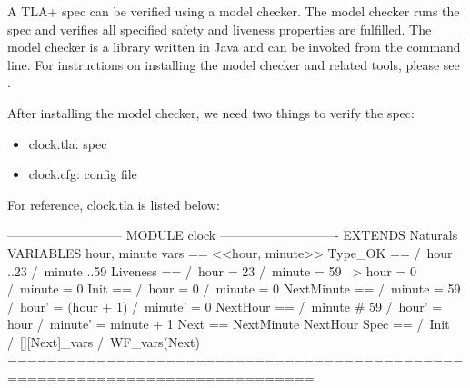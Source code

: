 A TLA+ spec can be verified using a model checker. The model checker runs the spec
and verifies all specified safety and liveness properties are fulfilled. The
model checker is a library written in Java and can be invoked from the command
line. For instructions on installing the model checker and related tools, please
see \cite{toolbox}.\newline

After installing the model checker, we need two things to verify the spec:
\begin{itemize}
    \item clock.tla: spec 
    \item clock.cfg: config file
\end{itemize}

For reference, clock.tla is listed below:\newline

\begin{tla}
--------------------------- MODULE clock ----------------------------
EXTENDS Naturals
VARIABLES hour, minute
vars == <<hour, minute>>
Type_OK == 
    /\ hour ..23
    /\ minute ..59
Liveness ==
    /\ hour = 23 /\ minute = 59 ~> hour = 0 /\ minute = 0
Init ==
    /\ hour = 0
    /\ minute = 0
NextMinute ==
    /\ minute = 59 
    /\ hour' = (hour + 1) %
    /\ minute' = 0
NextHour == 
    /\ minute # 59
    /\ hour' = hour 
    /\ minute' = minute + 1 
Next ==
    \/ NextMinute
    \/ NextHour
Spec ==
  /\ Init
  /\ [][Next]_vars
  /\ WF_vars(Next)
=============================================================================
\end{tla}
\begin{tlatex}
\@x{}\moduleLeftDash{}\moduleRightDash\@xx{}%
%
%
%
%
%
%
%
%
%
%
%
%
%
%
%
%
%
%
%
%
%
%
%
%
%
\@x{}\bottombar\@xx{}%
\end{tlatex}

